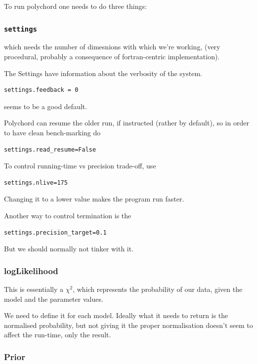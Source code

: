\documentclass[11pt]{article}
\begin{document}
To run polychord one needs to do three things:

\subsubsection{\texttt{settings}}
\label{sec:orgd99f279}

which needs the number of dimesnions with which we're working,
(very procedural, probably a consequence of fortran-centric
implementation).

The Settings have information about the verbosity of the
system.

\begin{verbatim}
settings.feedback = 0
\end{verbatim}
seems to be a good default. 

Polychord can resume the older run, if instructed (rather by
default), so in order to have clean bench-marking do

\begin{verbatim}
settings.read_resume=False
\end{verbatim}

To control running-time vs precision trade-off, use 

\begin{verbatim}
settings.nlive=175
\end{verbatim}

Changing it to a lower value makes the program run faster. 

Another way to control termination is the 

\begin{verbatim}
settings.precision_target=0.1
\end{verbatim}

But we should normally not tinker with it. 

\subsubsection{logLikelihood}
\label{sec:org1e7216f}

This is essentially a \(\chi^2\), which represents the
probability of our data, given the model and the parameter
values.

We need to define it for each model. Ideally what it needs to
return is the normalised probability, but not giving it the
proper normalisation doesn't seem to affect the run-time, only
the result.

\subsubsection{Prior}
\label{sec:orgc1c0804}
\end{document}
